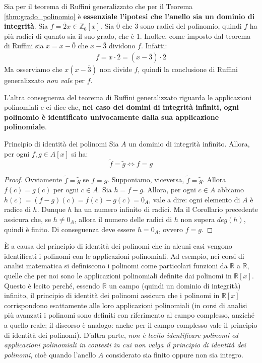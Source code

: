 \begin{osservation}
	Sia per il teorema di Ruffini generalizzato che per il Teorema \ref{thm:grado_polinomio} è \textbf{essenziale l’ipotesi che l'anello sia un dominio di integrità}. Sia $f=\overline{2}x \in \mathbb{Z}_{6}[x]$. Sia $\overline{0}$ che $\overline{3}$ sono radici del polinomio, quindi $f$ ha più radici di quanto sia il suo grado, che è 1. Inoltre, come imposto dal teorema di Ruffini sia $x = x - \overline{0}$ che $x- \overline{3}$ dividono $f$. Infatti:
	\begin{align*}
		f = x \cdot \overline{2} = (x- \overline{3}) \cdot \overline{2}
	\end{align*}
Ma osserviamo che $x(x-\overline{3})$ non divide $f$, quindi la conclusione di Ruffini generalizzato \emph{non vale} per $f$.
\end{osservation}

L’altra conseguenza del teorema di Ruffini generalizzato riguarda le applicazioni polinomiali e ci dice che, \textbf{nel caso dei domini di integrità infiniti, ogni polinomio è identificato univocamente dalla sua applicazione polinomiale}.

\begin{propbox}
	Principio di identità dei polinomi
	Sia $A$ un dominio di integrità infinito. Allora, per ogni $f,g \in A[x]$ si ha:
	\begin{displaymath}
		\widetilde{f} = \widetilde{g} \iff f=g
	\end{displaymath}
\end{propbox}

\begin{proof}
	Ovviamente $\widetilde{f} = \widetilde{g}$ se $f=g$. Supponiamo, viceversa, $\widetilde{f} = \widetilde{g}$. Allora $f(c)=g(c)$ per ogni $c \in A$. Sia $h = f-g$. Allora, per ogni $c \in A$ abbiamo $h(c) = (f-g)(c)=f(c)-g(c)=0_{A}$, vale a dire: ogni elemento di $A$ è radice di $h$. Dunque $h$ ha un numero infinito di radici. Ma il Corollario precedente assicura che, se $h \neq 0_{A}$, allora il numero delle radici di $h$ non supera $deg(h)$, quindi è finito. Di conseguenza deve essere $h=0_{A}$, ovvero $f=g$.
\end{proof}


È a causa del principio di identità dei polinomi che in alcuni casi vengono identificati i polinomi con le applicazioni polinomiali. Ad esempio, nei corsi di analisi matematica si definiscono i polinomi come particolari funzioni da $\mathbb{R}$ a $\mathbb{R}$, quelle che per noi sono le applicazioni polinomiali definite dai polinomi in $\mathbb{R}[x]$. Questo è lecito perché, essendo $\mathbb{R}$ un campo (quindi un dominio di integrità) infinito, il principio di identità dei polinomi assicura che i polinomi in $\mathbb{R}[x]$ corrispondono esattamente alle loro applicazioni polinomiali (in corsi di analisi più avanzati i polinomi sono definiti con riferimento al campo complesso, anziché a quello reale; il discorso è analogo: anche per il campo complesso vale il principio di identità dei polinomi). D’altra parte, \emph{non è lecito identificare polinomi ed applicazioni polinomiali in contesti in cui non valga il principio di identità dei polinomi}, cioè quando l’anello $A$ considerato sia finito oppure non sia integro.


